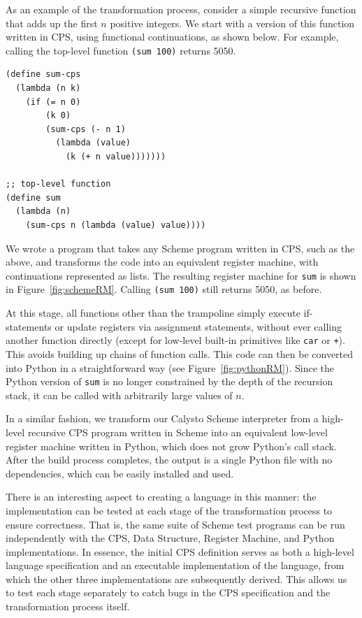 \documentclass[acmsmall,screen,anonymous,review]{acmart}
\begin{document}
As an example of the transformation process, consider a simple recursive
function that adds up the first $n$ positive integers.  We start with a version
of this function written in CPS, using functional continuations, as shown
below.  For example, calling the top-level function \texttt{(sum 100)} returns
5050.

{\small
\begin{verbatim}
(define sum-cps
  (lambda (n k)
    (if (= n 0)
        (k 0)
        (sum-cps (- n 1)
          (lambda (value)
            (k (+ n value)))))))

;; top-level function
(define sum
  (lambda (n)
    (sum-cps n (lambda (value) value))))
\end{verbatim}
}

\noindent
We wrote a program that takes any Scheme program written in CPS, such as the
above, and transforms the code into an equivalent register machine, with
continuations represented as lists.  The resulting register machine for
\texttt{sum} is shown in Figure~\ref{fig:schemeRM}.  Calling \texttt{(sum 100)}
still returns 5050, as before.

At this stage, all functions other than the trampoline simply execute
if-statements or update registers via assignment statements, without ever
calling another function directly (except for low-level built-in primitives
like \texttt{car} or \texttt{+}).  This avoids building up chains of function
calls.  This code can then be converted into Python in a straightforward way
(see Figure~\ref{fig:pythonRM}).  Since the Python version of \texttt{sum} is
no longer constrained by the depth of the recursion stack, it can be called
with arbitrarily large values of $n$.

In a similar fashion, we transform our Calysto Scheme interpreter from a
high-level recursive CPS program written in Scheme into an equivalent low-level
register machine written in Python, which does not grow Python's call stack.
After the build process completes, the output is a single Python file with no
dependencies, which can be easily installed and used.

There is an interesting aspect to creating a language in this manner: the
implementation can be tested at each stage of the transformation process to
ensure correctness. That is, the same suite of Scheme test programs can be run
independently with the CPS, Data Structure, Register Machine, and Python
implementations. In essence, the initial CPS definition serves as both a
high-level language specification and an executable implementation of the
language, from which the other three implementations are subsequently
derived. This allows us to test each stage separately to catch bugs in the CPS
specification and the transformation process itself.
\end{document}
